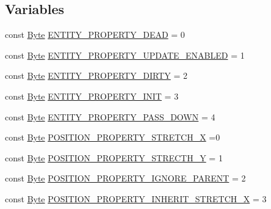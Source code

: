\subsection*{Variables}
\begin{DoxyCompactItemize}
\item 
const \hyperlink{namespacemc_a64bc4fa1f43bc4da5c7ac98c04c863e8}{Byte} \hyperlink{namespacemc_a6a2ed19ea381451dcc4d8229a0ce3a79}{E\+N\+T\+I\+T\+Y\+\_\+\+P\+R\+O\+P\+E\+R\+T\+Y\+\_\+\+D\+E\+AD} = 0
\item 
const \hyperlink{namespacemc_a64bc4fa1f43bc4da5c7ac98c04c863e8}{Byte} \hyperlink{namespacemc_afcf43f98aa3733418994e9e1cadd7ce7}{E\+N\+T\+I\+T\+Y\+\_\+\+P\+R\+O\+P\+E\+R\+T\+Y\+\_\+\+U\+P\+D\+A\+T\+E\+\_\+\+E\+N\+A\+B\+L\+ED} = 1
\item 
const \hyperlink{namespacemc_a64bc4fa1f43bc4da5c7ac98c04c863e8}{Byte} \hyperlink{namespacemc_a68ae3eb7148606fe27d62d968b47294b}{E\+N\+T\+I\+T\+Y\+\_\+\+P\+R\+O\+P\+E\+R\+T\+Y\+\_\+\+D\+I\+R\+TY} = 2
\item 
const \hyperlink{namespacemc_a64bc4fa1f43bc4da5c7ac98c04c863e8}{Byte} \hyperlink{namespacemc_a0702c8f305365db8ecb2b5c4631e6fdc}{E\+N\+T\+I\+T\+Y\+\_\+\+P\+R\+O\+P\+E\+R\+T\+Y\+\_\+\+I\+N\+IT} = 3
\item 
const \hyperlink{namespacemc_a64bc4fa1f43bc4da5c7ac98c04c863e8}{Byte} \hyperlink{namespacemc_a4464618e931e7662c7042c3e6ef03f63}{E\+N\+T\+I\+T\+Y\+\_\+\+P\+R\+O\+P\+E\+R\+T\+Y\+\_\+\+P\+A\+S\+S\+\_\+\+D\+O\+WN} = 4
\item 
const \hyperlink{namespacemc_a64bc4fa1f43bc4da5c7ac98c04c863e8}{Byte} \hyperlink{namespacemc_a3f402a582017395627a94f19c99ae875}{P\+O\+S\+I\+T\+I\+O\+N\+\_\+\+P\+R\+O\+P\+E\+R\+T\+Y\+\_\+\+S\+T\+R\+E\+T\+C\+H\+\_\+X} =0
\item 
const \hyperlink{namespacemc_a64bc4fa1f43bc4da5c7ac98c04c863e8}{Byte} \hyperlink{namespacemc_a93b89015c5feaff1a86607a1bbe5b7b6}{P\+O\+S\+I\+T\+I\+O\+N\+\_\+\+P\+R\+O\+P\+E\+R\+T\+Y\+\_\+\+S\+T\+R\+E\+C\+T\+H\+\_\+Y} = 1
\item 
const \hyperlink{namespacemc_a64bc4fa1f43bc4da5c7ac98c04c863e8}{Byte} \hyperlink{namespacemc_a9085688ce1dec515cd75c6fef11a1ec5}{P\+O\+S\+I\+T\+I\+O\+N\+\_\+\+P\+R\+O\+P\+E\+R\+T\+Y\+\_\+\+I\+G\+N\+O\+R\+E\+\_\+\+P\+A\+R\+E\+NT} = 2
\item 
const \hyperlink{namespacemc_a64bc4fa1f43bc4da5c7ac98c04c863e8}{Byte} \hyperlink{namespacemc_a1ddeace50be9bf89c37a08de87213e85}{P\+O\+S\+I\+T\+I\+O\+N\+\_\+\+P\+R\+O\+P\+E\+R\+T\+Y\+\_\+\+I\+N\+H\+E\+R\+I\+T\+\_\+\+S\+T\+R\+E\+T\+C\+H\+\_\+X} = 3

\end{DoxyCompactItemize}
